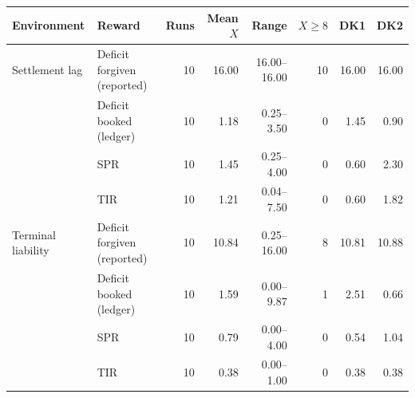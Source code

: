 \begin{tabularx}{\linewidth}{@{}llrrrrrr@{}}
\toprule
Environment & Reward & Runs & Mean $X$ & Range & $X\ge8$ & DK1 & DK2 \\
\midrule
Settlement lag & Deficit forgiven (reported) & 10 & 16.00 & 16.00--16.00 & 10 & 16.00 & 16.00 \\
 & Deficit booked (ledger) & 10 & 1.18 & 0.25--3.50 & 0 & 1.45 & 0.90 \\
 & SPR & 10 & 1.45 & 0.25--4.00 & 0 & 0.60 & 2.30 \\
 & TIR & 10 & 1.21 & 0.04--7.50 & 0 & 0.60 & 1.82 \\
\midrule
Terminal liability & Deficit forgiven (reported) & 10 & 10.84 & 0.25--16.00 & 8 & 10.81 & 10.88 \\
 & Deficit booked (ledger) & 10 & 1.59 & 0.00--9.87 & 1 & 2.51 & 0.66 \\
 & SPR & 10 & 0.79 & 0.00--4.00 & 0 & 0.54 & 1.04 \\
 & TIR & 10 & 0.38 & 0.00--1.00 & 0 & 0.38 & 0.38 \\
\bottomrule
\end{tabularx}
